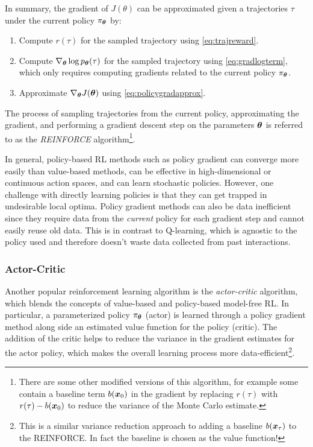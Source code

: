 In summary, the gradient of $J(\theta)$ can be approximated given a trajectories $\tau$ under the current policy $\pi_{\bm{\theta}}$ by:
\begin{enumerate}
\item Compute $r(\tau)$ for the sampled trajectory using \eqref{eq:trajreward}.
\item Compute $\nabla_{\bm{\theta}} \log p_{\bm{\theta}}(\tau)$ for the sampled trajectory using \eqref{eq:gradlogterm}, which only requires computing gradients related to the current policy $\pi_{\bm{\theta}}$.
\item Approximate $\nabla_{\bm{\theta}} J(\bm{\theta})$ using \eqref{eq:policygradapprox}.
\end{enumerate}
The process of sampling trajectories from the current policy, approximating the gradient, and performing a gradient descent step on the parameters $\bm{\theta}$ is referred to as the \textit{REINFORCE} algorithm\footnote{There are some other modified versions of this algorithm, for example some contain a baseline term $b(\bm{x}_0)$ in the gradient by replacing $r(\tau)$ with $r(\tau) - b(\bm{x}_0)$ to reduce the variance of the Monte Carlo estimate.}.

In general, policy-based RL methods such as policy gradient can converge more easily than value-based methods, can be effective in high-dimensional or continuous action spaces, and can learn stochastic policies. However, one challenge with directly learning policies is that they can get trapped in undesirable local optima. Policy gradient methods can also be data inefficient since they require data from the \textit{current} policy for each gradient step and cannot easily reuse old data.
This is in contrast to Q-learning, which is agnostic to the policy used and therefore doesn't waste data collected from past interactions.

\subsubsection{Actor-Critic}
Another popular reinforcement learning algorithm is the \textit{actor-critic} algorithm, which blends the concepts of value-based and policy-based model-free RL. In particular, a parameterized policy $\pi_{\bm{\theta}}$ (actor) is learned through a policy gradient method along side an estimated value function for the policy (critic). The addition of the critic helps to reduce the variance in the gradient estimates for the actor policy, which makes the overall learning process more data-efficient\footnote{This is a similar variance reduction approach to adding a baseline $b(\bm{x}_\tau)$ to the REINFORCE. In fact the baseline is chosen as the value function!}.

